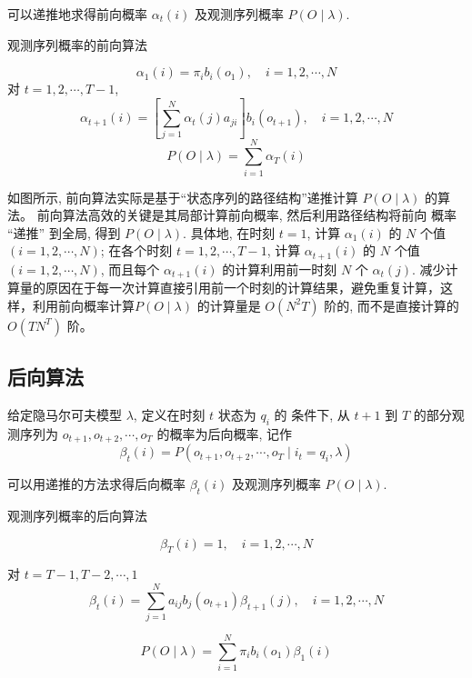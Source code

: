 可以递推地求得前向概率 $ \alpha_{t}(i) $ 及观测序列概率 $ P(O \mid \lambda) $.

\begin{algorithm}[htbp]
    \caption{观测序列概率的前向算法}


    $$ \alpha_{1}(i)=\pi_{i} b_{i}\left(o_{1}\right), \quad i=1,2, \cdots, N $$\;
    对 $ t=1,2, \cdots, T-1 $,
$$
\alpha_{t+1}(i)=\left[\sum_{j=1}^{N} \alpha_{t}(j) a_{j i}\right] b_{i}\left(o_{t+1}\right), \quad i=1,2, \cdots, N
$$\;
$$ P(O \mid \lambda)=\sum_{i=1}^{N} \alpha_{T}(i) $$\;
\end{algorithm}

如图所示, 前向算法实际是基于“状态序列的路径结构”递推计算 $ P(O \mid \lambda) $ 的算法。 前向算法高效的关键是其局部计算前向概率, 然后利用路径结构将前向 概率 “递推” 到全局, 得到 $ P(O \mid \lambda) $. 具体地, 在时刻 $ t=1 $, 计算 $ \alpha_{1}(i) $ 的 $ N $ 个值$ (i=1,2, \cdots, N) $; 在各个时刻 $ t=1,2, \cdots, T-1 $, 计算 $ \alpha_{t+1}(i) $ 的 $ N $ 个值 $ (i=1,2, \cdots, N) $, 而且每个 $ \alpha_{t+1}(i) $ 的计算利用前一时刻 $ N $ 个 $ \alpha_{t}(j) $. 减少计算量的原因在于每一次计算直接引用前一个时刻的计算结果，避免重复计算，这样，利用前向概率计算$ P(O \mid \lambda) $ 的计算量是 $ O\left(N^{2} T\right) $ 阶的, 而不是直接计算的 $ O\left(T N^{T}\right) $ 阶。

\subsection{后向算法}

\begin{definition}[后向概率]
    给定隐马尔可夫模型 $\lambda$, 定义在时刻 $t$ 状态为 $q_{i}$ 的 条件下, 从 $t+1$ 到 $T$ 的部分观测序列为 $o_{t+1}, o_{t+2}, \cdots, o_{T}$ 的概率为后向概率, 记作
$$
\beta_{t}(i)=P\left(o_{t+1}, o_{t+2}, \cdots, o_{T} \mid i_{t}=q_{i}, \lambda\right)
$$

\end{definition}

可以用递推的方法求得后向概率 $\beta_{t}(i)$ 及观测序列概率 $P(O \mid \lambda)$.

\begin{algorithm}[htbp]
    \caption{观测序列概率的后向算法}

    $$ \beta_{T}(i)=1, \quad i=1,2, \cdots, N $$\;

    对   $ t=T-1, T-2, \cdots, 1 $
    $$ \beta_{t}(i)=\sum_{j=1}^{N} a_{i j} b_{j}\left(o_{t+1}\right) \beta_{t+1}(j), \quad i=1,2, \cdots, N $$\;

    $$ P(O \mid \lambda)=\sum_{i=1}^{N} \pi_{i} b_{i}\left(o_{1}\right) \beta_{1}(i) $$\;
\end{algorithm}

